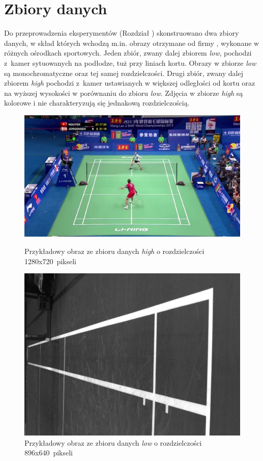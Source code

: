 \section{Zbiory danych}
\label{sec:zbiory}
Do przeprowadzenia eksperymentów (Rozdział ) skonstruowano dwa zbiory danych, w skład których wchodzą m.in. obrazy otrzymane od firmy \blue{}, wykonane w różnych ośrodkach sportowych.
Jeden zbiór, zwany dalej zbiorem \textit{low}, pochodzi z~kamer sytuowanych na podłodze, tuż przy liniach kortu. Obrazy w zbiorze \textit{low} są monochromatyczne oraz tej samej rozdzielczości.
Drugi zbiór, zwany dalej zbiorem \textit{high} pochodzi z~kamer ustawianych w większej odległości od kortu oraz na wyższej wysokości w porównaniu do zbioru \textit{low}. Zdjęcia w zbiorze \textit{high} są kolorowe i nie charakteryzują się jednakową rozdzielczością.


\begin{figure}[!htb]
    \includegraphics[width=\linewidth]{../../badminton/datasets/high/split/test_court2-00002.png}
    \caption{Przykładowy obraz ze zbioru danych \textit{high} o rozdzielczości 1280x720~pikseli}
  \endminipage\hfill
    \includegraphics[width=\linewidth]{../../badminton/datasets/low/split/1564909032792410075.jpg}
    \caption{Przykładowy obraz ze zbioru danych \textit{low} o rozdzielczości 896x640~pikseli}
  \endminipage\hfill
\end{figure}

